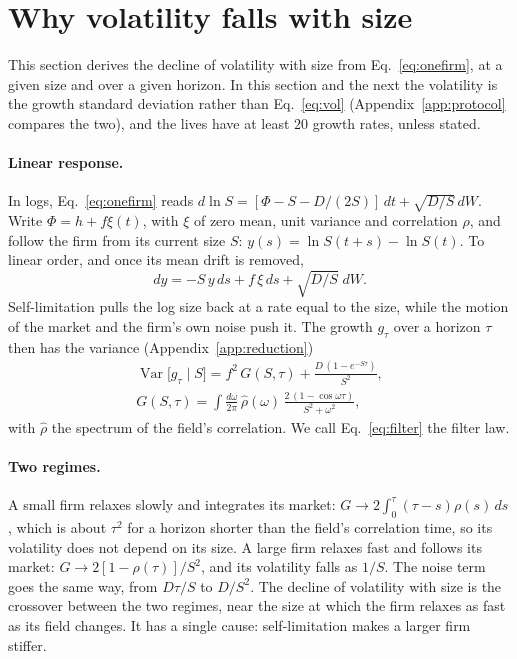 \documentclass[pre,twocolumn,superscriptaddress,nofootinbib]{revtex4-2}
\newcommand{\Var}{\operatorname{Var}}
\begin{document}
\section{Why volatility falls with size}
\label{sec:filter}

This section derives the decline of volatility with size from Eq.~\eqref{eq:onefirm}, at a given size and over a
given horizon.  In this section and the next the volatility is the growth standard deviation rather than Eq.~\eqref{eq:vol}
(Appendix~\ref{app:protocol} compares the two), and the lives have at least $20$ growth rates, unless stated.

\paragraph{Linear response.}  In logs, Eq.~\eqref{eq:onefirm} reads $d\ln S=[\Phi-S-D/(2S)]\,dt+\sqrt{D/S}\,dW$.
Write $\Phi=h+f\xi(t)$, with $\xi$ of zero mean, unit variance and correlation $\rho$, and follow the firm from its
current size $S$: $y(s)=\ln S(t+s)-\ln S(t)$.  To linear order, and once its mean drift is removed,
\begin{equation*}
dy=-S\,y\,ds+f\,\xi\,ds+\sqrt{D/S}\;dW .
\end{equation*}
Self-limitation pulls the log size back at a rate equal to the size, while the motion of the market and the firm's
own noise push it.  The growth $g_\tau$ over a horizon $\tau$ then has the variance (Appendix~\ref{app:reduction})
\begin{gather}
\Var\big[g_\tau\mid S\big]=f^2\,G(S,\tau)+\frac{D\,(1-e^{-S\tau})}{S^2},\label{eq:filter}\\
G(S,\tau)=\int\frac{d\omega}{2\pi}\,\hat\rho(\omega)\,\frac{2\,(1-\cos\omega\tau)}{S^2+\omega^2},\nonumber
\end{gather}
with $\hat\rho$ the spectrum of the field's correlation.  We call Eq.~\eqref{eq:filter} the filter law.

\paragraph{Two regimes.}  A small firm relaxes slowly and integrates its market: $G\to2\int_0^\tau(\tau-s)\rho(s)\,ds$,
which is about $\tau^2$ for a horizon shorter than the field's correlation time, so its volatility does not depend on
its size.  A large firm relaxes fast and follows its market: $G\to2[1-\rho(\tau)]/S^2$, and its volatility falls as
$1/S$.  The noise term goes the same way, from $D\tau/S$ to $D/S^2$.  The decline of volatility with size is the
crossover between the two regimes, near the size at which the firm relaxes as fast as its field changes.  It has a
single cause: self-limitation makes a larger firm stiffer.
\end{document}
